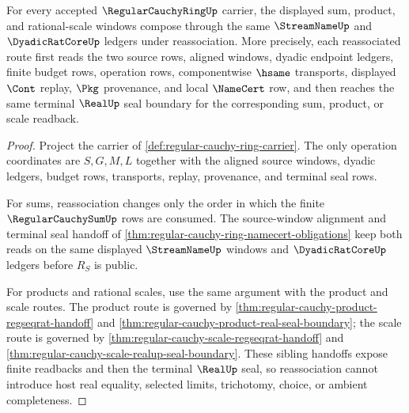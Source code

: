 \begin{theorem}
\label{thm:regular-cauchy-ring-windowwise-associativity}
For every accepted $\RegularCauchyRingUp$ carrier, the displayed sum, product, and rational-scale windows compose through the same $\StreamNameUp$ and $\DyadicRatCoreUp$ ledgers under reassociation. More precisely, each reassociated route first reads the two source rows, aligned windows, dyadic endpoint ledgers, finite budget rows, operation rows, componentwise $\hsame$ transports, displayed $\Cont$ replay, $\Pkg$ provenance, and local $\NameCert$ row, and then reaches the same terminal $\RealUp$ seal boundary for the corresponding sum, product, or scale readback.
\end{theorem}
\begin{proof}
Project the carrier of \autoref{def:regular-cauchy-ring-carrier}. The only operation coordinates are $S,G,M,L$ together with the aligned source windows, dyadic ledgers, budget rows, transports, replay, provenance, and terminal seal rows.

For sums, reassociation changes only the order in which the finite $\RegularCauchySumUp$ rows are consumed. The source-window alignment and terminal seal handoff of \autoref{thm:regular-cauchy-ring-namecert-obligations} keep both reads on the same displayed $\StreamNameUp$ windows and $\DyadicRatCoreUp$ ledgers before $R_S$ is public.

For products and rational scales, use the same argument with the product and scale routes. The product route is governed by \autoref{thm:regular-cauchy-product-regseqrat-handoff} and \autoref{thm:regular-cauchy-product-real-seal-boundary}; the scale route is governed by \autoref{thm:regular-cauchy-scale-regseqrat-handoff} and \autoref{thm:regular-cauchy-scale-realup-seal-boundary}. These sibling handoffs expose finite readbacks and then the terminal $\RealUp$ seal, so reassociation cannot introduce host real equality, selected limits, trichotomy, choice, or ambient completeness.
\end{proof}

